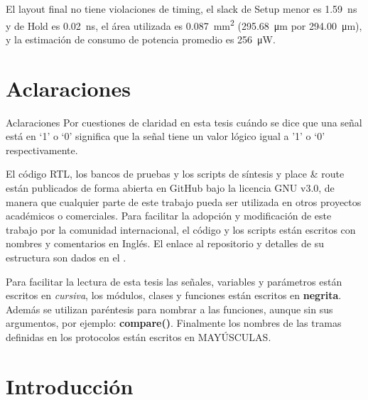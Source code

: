 \documentclass[a4paper, twoside, 11pt]{report}
\begin{document}
El layout final no tiene violaciones de timing, el slack de Setup menor es \SI{1,59}{\nano\second} y de Hold es \SI{0,02}{\nano\second}, el área utilizada es \SI{0,087}{\milli\meter\squared} (\SI{295,68}{\micro\meter} por \SI{294,00}{\micro\meter}), y la estimación de consumo de potencia promedio es \SI{256}{\micro\watt}.


\FloatBarrier
\chapter*{Aclaraciones}

Aclaraciones
Por cuestiones de claridad en esta tesis cuándo se dice que una señal está en ‘1’ o ‘0’ significa que la señal tiene un valor lógico igual a '1' o ‘0’ respectivamente.

El código RTL, los bancos de pruebas y los scripts de síntesis y place \& route están publicados de forma abierta en GitHub bajo la licencia GNU v3.0, de manera que cualquier parte de este trabajo pueda ser utilizada en otros proyectos académicos o comerciales. Para facilitar la adopción y modificación de este trabajo por la comunidad internacional, el código y los scripts están escritos con nombres y comentarios en Inglés. El enlace al repositorio y detalles de su estructura son dados en el .

Para facilitar la lectura de esta tesis las señales, variables y parámetros están escritos en \textit{cursiva},  los módulos, clases y funciones están escritos en \textbf{negrita}. Además se utilizan paréntesis para nombrar a las funciones, aunque sin sus argumentos, por ejemplo: \textbf{compare()}. Finalmente los nombres de las tramas definidas en los protocolos están escritos en MAYÚSCULAS.

\newpage
\tableofcontents


\FloatBarrier
\chapter{Introducción}
\end{document}
